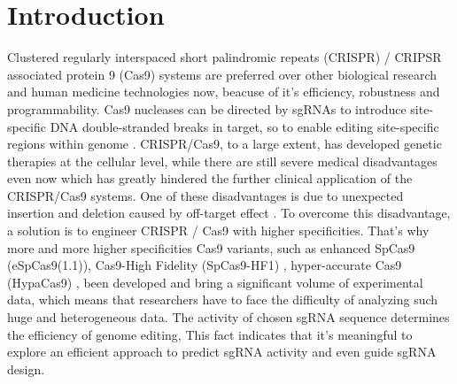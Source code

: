 \documentclass{bioinfo}
\begin{document}
\maketitle

\section{Introduction}

Clustered regularly interspaced short palindromic repeats (CRISPR) / CRIPSR associated protein 9 (Cas9) systems are preferred over other biological research and human medicine technologies now, 
beacuse of it's efficiency, robustness and programmability. 
Cas9 nucleases can be directed by sgRNAs to introduce site-specific DNA double-stranded breaks in target, 
so to enable editing site-specific regions within genome \citep{jinek2012a,cong2013multiplex,mali2013rnaguided}. 
CRISPR/Cas9, to a large extent, has developed genetic therapies at the cellular level, 
while there are still severe medical disadvantages even now which has greatly hindered the further clinical application of the CRISPR/Cas9 systems. 
One of these disadvantages is due to unexpected insertion and deletion caused by off-target effect \citep{rubeis2018risks,kang2016introducing,ishii2017reproductive,liang2015crispr/cas9-mediated}. 
To overcome this disadvantage, a solution is to engineer CRISPR / Cas9 with higher specificities. 
That's why more and more higher specificities Cas9 variants, such as enhanced SpCas9 (eSpCas9(1.1)), 
Cas9-High Fidelity (SpCas9-HF1) \citep{slaymaker2016rationally,ishii2017reproductive}, hyper-accurate Cas9 (HypaCas9) \citep{kleinstiver2016high-fidelity}, 
been developed and bring a significant volume of experimental data, which means that researchers have to face the difficulty of analyzing such huge and heterogeneous data.
The activity of chosen sgRNA sequence determines the efficiency of genome editing, 
This fact indicates that it's meaningful to explore an efficient approach to predict sgRNA activity and even guide sgRNA design. 
\end{document}
